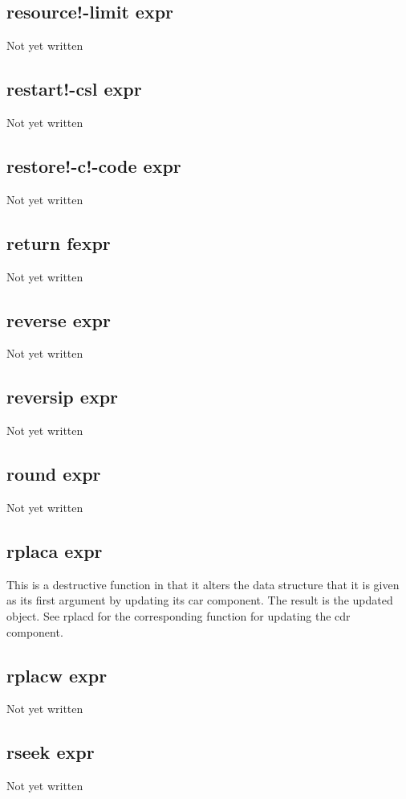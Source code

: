 \documentclass[a4paper,11pt]{article}
\begin{document}
{\subsection{\ttfamily resource!-limit expr}
Not yet written

\subsection{\ttfamily restart!-csl expr}
Not yet written

\subsection{\ttfamily restore!-c!-code expr}
Not yet written

\subsection{\ttfamily return fexpr}
Not yet written

\subsection{\ttfamily reverse expr}
Not yet written

\subsection{\ttfamily reversip expr}
Not yet written

\subsection{\ttfamily round expr}
Not yet written

\subsection{\ttfamily rplaca expr}
This is a destructive function in that it alters the data structure
that it is given as its first argument by updating its {\ttfamily car}
component. The result is the updated object. See {\ttfamily rplacd}
for the corresponding function for updating the {\ttfamily cdr} component.

\subsection{\ttfamily rplacw expr}
Not yet written

\subsection{\ttfamily rseek expr}
Not yet written

}
\end{document}

